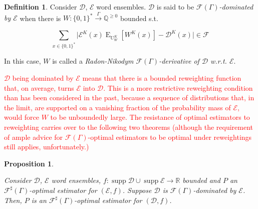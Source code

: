 \documentclass[11pt]{article}
\numberwithin{equation}{section}
\theoremstyle{definition}
\newtheorem{definition}{Definition}[section]
\theoremstyle{plain}
\newtheorem{proposition}{Proposition}[section]
\newcommand{\Bool}{\{0,1\}}
\newcommand{\Words}{{\Bool^*}}
\DeclareMathOperator{\Supp}{supp}
\DeclareMathOperator{\E}{E}
\DeclareMathOperator{\Un}{U}
\newcommand{\Rats}{\mathbb{Q}}
\newcommand{\Reals}{\mathbb{R}}
\newcommand{\Abs}[1]{\lvert #1 \rvert}
\newcommand{\Dist}{\mathcal{D}}
\newcommand{\Fall}{\mathcal{F}}
\newcommand{\EG}{\Fall(\Gamma)}
\newcommand{\ESG}{\Fall^\sharp(\Gamma)}
\newcommand{\Scheme}{\xrightarrow{\Gamma}}
\begin{document}
\begin{samepage}
\begin{definition}

Consider ${\Dist}$, ${\mathcal{E}}$ word ensembles. ${\Dist}$ is said to be \emph{${\EG}$-dominated by ${\mathcal{E}}$} when there is ${W: \Words \Scheme \Rats^{\geq 0}}$ bounded s.t.

\begin{equation}
\sum_{x \in \Words} \Abs{\mathcal{E}^{K}(x)\E_{\Un_W^K}[W^K(x)]-\Dist^{K}(x)} \in \Fall
\end{equation}

In this case, ${W}$ is called a \emph{Radon-Nikodym ${\EG}$-derivative of ${\Dist}$ w.r.t. ${\mathcal{E}}$}.

\textcolor{red}{${\Dist}$ being dominated by ${\mathcal{E}}$ means that there is a bounded reweighting function that, on average, turns ${\mathcal{E}}$ into $\Dist$. This is a more restrictive reweighting condition than has been considered in the past, because a sequence of distributions that, in the limit, are supported on a vanishing fraction of the probability mass of $\mathcal{E}$, would force $W$ to be unboundedly large. The resistance of optimal estimators to reweighting carries over to the following two theorems (although the requirement of ample advice for $\EG$-optimal estimators to be optimal under reweightings still applies, unfortunately.) }
\end{definition}
\end{samepage}

\begin{samepage}
\begin{proposition}
\label{prp:dom_reduce_sharp}

Consider ${\Dist}$, ${\mathcal{E}}$ word ensembles, ${f: \Supp \Dist \cup \Supp \mathcal{E} \rightarrow \Reals}$ bounded and ${P}$ an ${\ESG}$-optimal estimator for ${(\mathcal{E},f)}$. Suppose ${\Dist}$ is ${\EG}$-dominated by ${\mathcal{E}}$. Then, ${P}$ is an ${\ESG}$-optimal estimator for ${(\Dist,f)}$.

\end{proposition}
\end{samepage}
\end{document}
